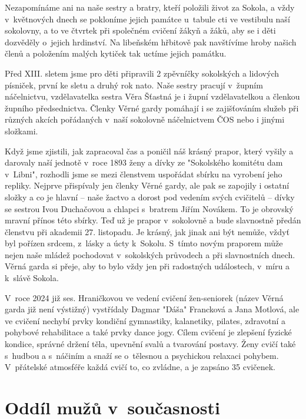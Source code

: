 \documentclass[a5paper, 12pt, twoside]{article}
\begin{document}
Nezapomínáme ani na naše sestry a bratry, kteří položili život za
Sokola, a vždy v~květnových dnech se pokloníme jejich památce u~tabule
cti ve vestibulu naší sokolovny, a to ve čtvrtek při společném cvičení
žákyň a žáků, aby se i děti dozvěděly o~jejich hrdinství. Na libeňském
hřbitově pak navštívíme hroby našich členů a položením malých kytiček
tak uctíme jejich památku.

Před XIII. sletem jsme pro děti připravili 2 zpěvníčky sokolských a
lidových písniček, první ke sletu a druhý rok nato. Naše sestry pracují
v~župním náčelnictvu, vzdělavatelka sestra Věra Šťastná je i župní
vzdělavatelkou a členkou župního předsednictva. Členky Věrné gardy
pomáhají i se zajišťováním služeb při různých akcích pořádaných v~naší
sokolovně náčelnictvem ČOS nebo i jinými složkami.

Když jsme zjistili, jak zapracoval čas a poničil náš krásný prapor,
který vyšily a darovaly naší jednotě v~roce 1893 ženy a dívky ze
"Sokolského komitétu dam v~Libni", rozhodli jsme se mezi členstvem
uspořádat sbírku na vyrobení jeho repliky. Nejprve přispívaly jen členky
Věrné gardy, ale pak se zapojily i ostatní složky a co je hlavní -- naše
žactvo a dorost pod vedením svých cvičitelů -- dívky se sestrou Ivou
Duchačovou a chlapci s~bratrem Jiřím Novákem. To je obrovský mravní
přínos této sbírky. Teď už je prapor v~sokolovně a bude slavnostně
předán členstvu při akademii 27. listopadu. Je krásný, jak jinak ani být
nemůže, vždyť byl pořízen srdcem, z~lásky a úcty k~Sokolu. S~tímto novým
praporem může nejen naše mládež pochodovat v~sokolských průvodech a při
slavnostních dnech. Věrná garda si přeje, aby to bylo vždy jen při
radostných událostech, v~míru a k~slávě Sokola.

V~roce 2024 již ses. Hraničkovou ve vedení cvičení žen-seniorek (název
Věrná garda již není výstižný) vystřídaly Dagmar "Dáša" Francková a
Jana Motlová, ale ve cvičení nechybí prvky kondiční gymnastiky,
kalanetiky, pilates, zdravotní a pohybové rehabilitace a také prvky
dance jogy. Cílem cvičení je zlepšení fyzické kondice, správné držení
těla, upevnění svalů a tvarování postavy. Ženy cvičí také s~hudbou a
s~náčiním a snaží se o~tělesnou a psychickou relaxaci pohybem. V~přátelské
atmosféře každá cvičí to, co zvládne, a je zapsáno 35 cvičenek.

\section{Oddíl mužů
v~současnosti}
\end{document}

